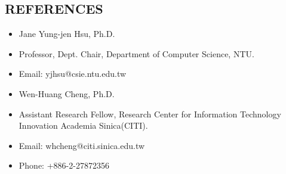 \documentclass[margin]{main}
\begin{document}
\begin{resume}
\section{REFERENCES}
\begin{itemize} \itemsep -2pt
    \item[] Jane Yung-jen Hsu, Ph.D.
    \item[] Professor, Dept. Chair, Department of Computer Science, NTU.
    \item[] Email: yjhsu@csie.ntu.edu.tw
    \\
    \item[] Wen-Huang Cheng, Ph.D.
    \item[] Assistant Research Fellow, Research Center for Information Technology Innovation Academia Sinica(CITI).
    \item[] Email: whcheng@citi.sinica.edu.tw
    \item[] Phone: +886-2-27872356
\end{itemize}

\end{resume}
\end{document}
